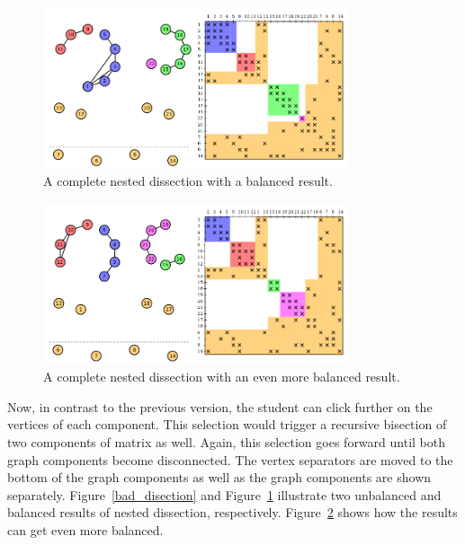 \documentclass[12pt, twoside,a4paper,toc=bibliography]{scrbook}
\begin{document}
\begin{figure}
\centering
\includegraphics[width=0.8\textwidth]{good_disection}
\caption{A complete nested dissection with a balanced result.}
\label{good_disection}
\end{figure}

\begin{figure}
\centering
\includegraphics[width=0.8\textwidth]{good_disection2}
\caption{A complete nested dissection with an even more balanced result.}
\label{good_disection2}
\end{figure}

Now, in contrast to the previous version, the student can click further
on the vertices of each component. This selection would trigger a recursive
bisection of two components of matrix as well. Again, this selection goes forward until
both graph components become disconnected. The vertex separators
are moved to the bottom of the graph components as well as the graph components
are shown separately.
Figure~\ref{bad_disection} and Figure~\ref{good_disection} 
illustrate two unbalanced and balanced results of nested dissection,
respectively. Figure~\ref{good_disection2} shows how the results can
get even more balanced.
\end{document}
